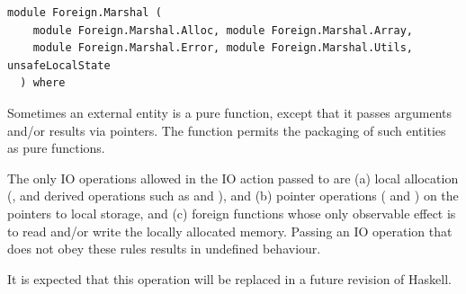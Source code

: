 \label{module:Foreign.Marshal}
\haddockbeginheader
{\haddockverb\begin{verbatim}
module Foreign.Marshal (
    module Foreign.Marshal.Alloc, module Foreign.Marshal.Array,
    module Foreign.Marshal.Error, module Foreign.Marshal.Utils, unsafeLocalState
  ) where\end{verbatim}}
\haddockendheader

\begin{haddockdesc}
\item[\begin{tabular}{@{}l}
module Foreign.Marshal.Alloc\\module Foreign.Marshal.Array\\module Foreign.Marshal.Error\\module Foreign.Marshal.Utils
\end{tabular}]
\end{haddockdesc}
\begin{haddockdesc}
\item[\begin{tabular}{@{}l}
unsafeLocalState :: IO a -> a
\end{tabular}]
{\haddockbegindoc
Sometimes an external entity is a pure function, except that it passes
arguments and/or results via pointers.  The function
 permits the packaging of such entities as pure
functions.\par
The only IO operations allowed in the IO action passed to
 are (a) local allocation (, 
and derived operations such as  and ), and (b)
pointer operations ( and ) on the
pointers to local storage, and (c) foreign functions whose only
observable effect is to read and/or write the locally allocated
memory.  Passing an IO operation that does not obey these rules
results in undefined behaviour.\par
It is expected that this operation will be
replaced in a future revision of Haskell.\par}
\end{haddockdesc}